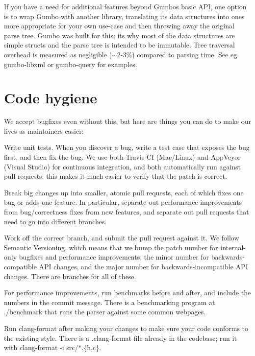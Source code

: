 If you have a need for additional features beyond Gumbo\textquotesingle{}s basic A\+PI, one option is to wrap Gumbo with another library, translating its data structures into ones more appropriate for your own use-\/case and then throwing away the original parse tree. Gumbo was built for this; it\textquotesingle{}s why most of the data structures are simple structs and the parse tree is intended to be immutable. Tree traversal overhead is measured as negligible ($\sim$2-\/3\%) compared to parsing time. See eg. gumbo-\/libxml or gumbo-\/query for examples.

\section*{Code hygiene }

We accept bugfixes even without this, but here are things you can do to make our lives as maintainers easier\+:


\begin{DoxyEnumerate}
\item Write unit tests. When you discover a bug, write a test case that exposes the bug first, and then fix the bug. We use both Travis CI (Mac/\+Linux) and App\+Veyor (Visual Studio) for continuous integration, and both automatically run against pull requests; this makes it much easier to verify that the patch is correct.
\item Break big changes up into smaller, atomic pull requests, each of which fixes one bug or adds one feature. In particular, separate out performance improvements from bug/correctness fixes from new features, and separate out pull requests that need to go into different branches.
\item Work off the correct branch, and submit the pull request against it. We follow Semantic Versioning, which means that we bump the patch number for internal-\/only bugfixes and performance improvements, the minor number for backwards-\/compatible A\+PI changes, and the major number for backwards-\/incompatible A\+PI changes. There are branches for all of these.
\item For performance improvements, run benchmarks before and after, and include the numbers in the commit message. There is a benchmarking program at ./benchmark that runs the parser against some common webpages.
\item Run clang-\/format after making your changes to make sure your code conforms to the existing style. There is a .clang-\/format file already in the codebase; run it with \textquotesingle{}clang-\/format -\/i src/$\ast$.\{h,c\}\textquotesingle{}. 
\end{DoxyEnumerate}